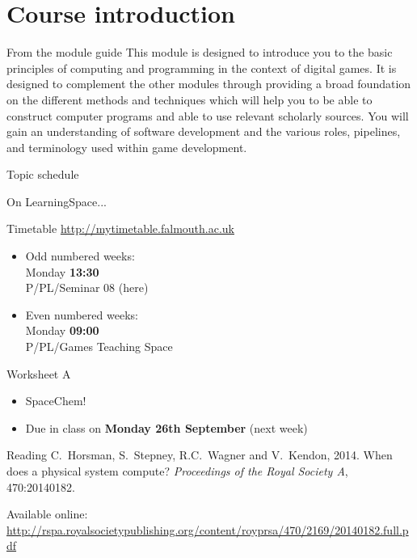 \part{Course introduction}
\frame{\partpage}

\begin{frame}{From the module guide}
This module is designed to introduce you to the basic principles of computing and programming in the context of digital games. It is designed to complement the other modules through providing a broad foundation on the different methods and techniques which will help you to be able to construct computer programs and able to use relevant scholarly sources. You will gain an understanding of software development and the various roles, pipelines, and terminology used within game development.
\end{frame}

\begin{frame}{Topic schedule}
	\begin{center}
		On LearningSpace...
	\end{center}
\end{frame}

\begin{frame}{Timetable}
	\url{http://mytimetable.falmouth.ac.uk}
	\begin{itemize}
		\item Odd numbered weeks: \\ Monday \textbf{13:30} \\ P/PL/Seminar 08 (here)
		\item Even numbered weeks: \\ Monday \textbf{09:00} \\ P/PL/Games Teaching Space
	\end{itemize}
\end{frame}

\begin{frame}{Worksheet A}
	\begin{itemize}
		\item SpaceChem!
		\item Due in class on \textbf{Monday 26th September} (next week)
	\end{itemize}
\end{frame}

\begin{frame}{Reading}
	C.\ Horsman, S.\ Stepney, R.C.\ Wagner and V.\ Kendon, 2014.
	When does a physical system compute?
	\emph{Proceedings of the Royal Society A},
	470:20140182.
	
	Available online: \url{http://rspa.royalsocietypublishing.org/content/royprsa/470/2169/20140182.full.pdf}
\end{frame}
